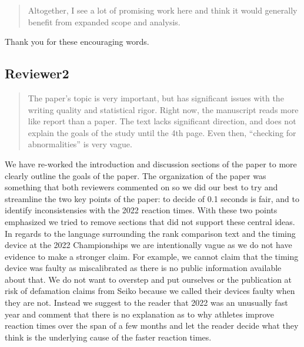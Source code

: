 \documentclass[12pt]{article}
\newenvironment{comment}%
{\begin{quotation}\noindent\small\it\color{darkblue}\ignorespaces%
}{\end{quotation}}
\begin{document}
\begin{comment}
Altogether, I see a lot of promising work here and think it would generally
benefit from expanded scope and analysis.
\end{comment}


Thank you for these encouraging words.

\subsection*{Reviewer2}


\begin{comment}
The paper’s topic is very important, but has significant issues with the writing
quality and statistical rigor. Right now, the manuscript reads more like report
than a paper. The text lacks significant direction, and does not explain the
goals of the study until the 4th page. Even then, “checking for abnormalities”
is very vague.

\end{comment}


We have re-worked the introduction and discussion sections of the paper to more
clearly outline the goals of the paper.  The organization of the paper was
something that both reviewers commented on so we did our best to try and
streamline the two key points of the paper: to decide of 0.1 seconds is fair,
and to identify inconsistensies with the 2022 reaction times. With these two
points emphasized we tried to remove sections that did not support these central
ideas.  In regards to the language surrounding the rank comparison text and the
timing device at the 2022 Championships we are intentionally vague as we do not
have evidence to make a stronger claim.  For example, we cannot claim that the
timing device was faulty as miscalibrated as there is no public information
available about that.  We do not want to overstep and put ourselves or the
publication at risk of defamation claims from Seiko because we called their
devices faulty when they are not.  Instead we suggest to the reader that 2022
was an unusually fast year and comment that there is no explanation as to why
athletes improve reaction times over the span of a few months and let the reader
decide what they think is the underlying cause of the faster reaction times.
\end{document}
